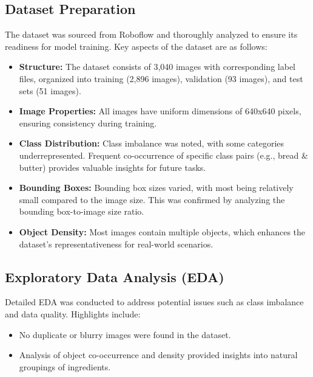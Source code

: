 \documentclass[letterpaper,11pt]{report}
\begin{document}
\subsection{Dataset Preparation}
The dataset was sourced from Roboflow and thoroughly analyzed to ensure its readiness for model training. Key aspects of the dataset are as follows:
\begin{itemize}
    \item \textbf{Structure:} The dataset consists of 3,040 images with corresponding label files, organized into training (2,896 images), validation (93 images), and test sets (51 images).
    \item \textbf{Image Properties:} All images have uniform dimensions of 640x640 pixels, ensuring consistency during training.
    \item \textbf{Class Distribution:} Class imbalance was noted, with some categories underrepresented. Frequent co-occurrence of specific class pairs (e.g., bread \& butter) provides valuable insights for future tasks.
    \item \textbf{Bounding Boxes:} Bounding box sizes varied, with most being relatively small compared to the image size. This was confirmed by analyzing the bounding box-to-image size ratio.
    \item \textbf{Object Density:} Most images contain multiple objects, which enhances the dataset's representativeness for real-world scenarios.
\end{itemize}

\subsection{Exploratory Data Analysis (EDA)}
Detailed EDA was conducted to address potential issues such as class imbalance and data quality. Highlights include:
\begin{itemize}
    \item No duplicate or blurry images were found in the dataset.
    \item Analysis of object co-occurrence and density provided insights into natural groupings of ingredients.
\end{itemize}

\end{document}
